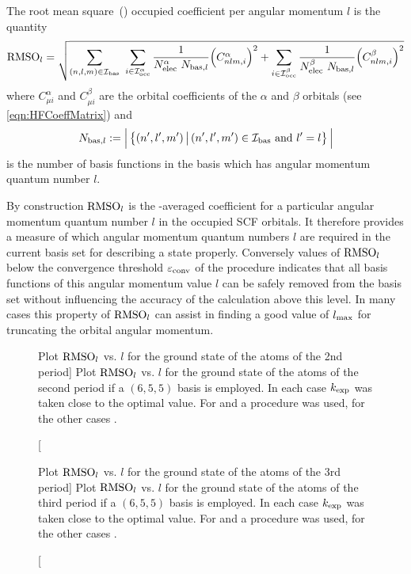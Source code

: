 \defineabbr{RMS}{RMS\xspace}{Root mean square}
\begin{defn}
	\label{defn:RMSOl}
	The root mean square~(\RMS) occupied coefficient per angular momentum $l$
	is the quantity
	\begin{equation}
	\text{RMSO}_l =
		\sqrt{
		\sum_{(n,l,m) \in \mathcal{I}_\text{bas}} \
		\sum_{i \in \mathcal{I}_\text{occ}^\alpha} \frac{1}{N_\text{elec}^\alpha \ N_{\text{bas}, l}}
			\Big(C^\alpha_{nlm, i} \Big)^2
			+ \sum_{i \in \mathcal{I}_\text{occ}^\beta} \frac{1}{N_\text{elec}^\beta \ N_{\text{bas}, l}}
			\Big( C^\beta_{nlm, i} \Big)^2
		}
		\label{eqn:DefRMSOl}
	\end{equation}
	where $C^\alpha_{\mu i}$ and $C^\beta_{\mu i}$
	are the orbital coefficients of the $\alpha$ and $\beta$ orbitals
	(see \eqref{eqn:HFCoeffMatrix})
	and
	\[
		N_{\text{bas}, l} := \Big| \left\{ (n',l',m') \, \big|\, (n',l',m') \in \mathcal{I}_\text{bas}
			\ \text{and} \ l' = l \right\} \Big|
	\]
	is the number of basis functions in the \CS basis which has angular momentum
	quantum number $l$.
\end{defn}

By construction $\text{RMSO}_l$ is the \RMS-averaged coefficient for a particular angular
momentum quantum number $l$ in the occupied SCF orbitals.
It therefore provides a measure of which angular momentum quantum numbers $l$
are required in the current basis set for describing a state properly.
Conversely values of $\text{RMSO}_l$ below the convergence threshold $\varepsilon_\text{conv}$
of the \SCF procedure indicates that all \CS basis functions of this angular momentum
value $l$ can be safely removed from the \CS basis set without
influencing the accuracy of the \HF calculation above this level.
In many cases this property of $\text{RMSO}_l$ can assist in finding a good
value of $l_\text{max}$ for truncating the orbital angular momentum.

\begin{figure}[p]
	\centering
	\caption
	[Plot $\text{RMSO}_l$ vs. $l$ for the \HF ground state of the atoms of the 2nd period]
	{
		Plot $\text{RMSO}_l$ vs. $l$ for the \HF ground state
		of the atoms of the second period
		if a $(6,5,5)$ \CS basis is employed.
		In each case $k_\text{exp}$ was taken close to the optimal value.
		For  and  a \RHF procedure was used,
		for the other cases \UHF.
	}
	\label{fig:RMSOl_period2}
\end{figure}
\begin{figure}[p]
	\centering
	\caption
	[Plot $\text{RMSO}_l$ vs. $l$ for the \HF ground state of the atoms of the 3rd period]
	{
		Plot $\text{RMSO}_l$ vs. $l$ for the \HF ground state
		of the atoms of the third period
		if a $(6,5,5)$ \CS basis is employed.
		In each case $k_\text{exp}$ was taken close to the optimal value.
		For  and  a \RHF procedure was used,
		for the other cases \UHF.
	}
	\label{fig:RMSOl_period3}
\end{figure}

